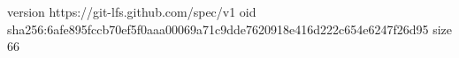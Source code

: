 version https://git-lfs.github.com/spec/v1
oid sha256:6afe895fccb70ef5f0aaa00069a71c9dde7620918e416d222c654e6247f26d95
size 66
